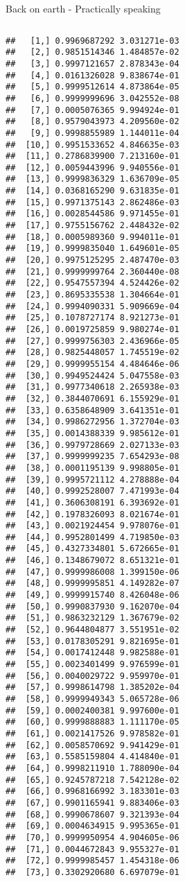 \begin{frame}[fragile]{Back on earth - Practically speaking}
\begin{columns}
\begin{column}{0.5\textwidth}
\begin{knitrout}
\begin{kframe}
\begin{verbatim}
##   [1,] 0.9969687292 3.031271e-03
##   [2,] 0.9851514346 1.484857e-02
##   [3,] 0.9997121657 2.878343e-04
##   [4,] 0.0161326028 9.838674e-01
##   [5,] 0.9999512614 4.873864e-05
##   [6,] 0.9999999696 3.042552e-08
##   [7,] 0.0005076365 9.994924e-01
##   [8,] 0.9579043973 4.209560e-02
##   [9,] 0.9998855989 1.144011e-04
##  [10,] 0.9951533652 4.846635e-03
##  [11,] 0.2786839900 7.213160e-01
##  [12,] 0.0059443996 9.940556e-01
##  [13,] 0.9999836329 1.636709e-05
##  [14,] 0.0368165290 9.631835e-01
##  [15,] 0.9971375143 2.862486e-03
##  [16,] 0.0028544586 9.971455e-01
##  [17,] 0.9755156762 2.448432e-02
##  [18,] 0.0005989360 9.994011e-01
##  [19,] 0.9999835040 1.649601e-05
##  [20,] 0.9975125295 2.487470e-03
##  [21,] 0.9999999764 2.360440e-08
##  [22,] 0.9547557394 4.524426e-02
##  [23,] 0.8695335538 1.304664e-01
##  [24,] 0.9994090331 5.909669e-04
##  [25,] 0.1078727174 8.921273e-01
##  [26,] 0.0019725859 9.980274e-01
##  [27,] 0.9999756303 2.436966e-05
##  [28,] 0.9825448057 1.745519e-02
##  [29,] 0.9999955154 4.484646e-06
##  [30,] 0.9949524424 5.047558e-03
##  [31,] 0.9977340618 2.265938e-03
##  [32,] 0.3844070691 6.155929e-01
##  [33,] 0.6358648909 3.641351e-01
##  [34,] 0.9986272956 1.372704e-03
##  [35,] 0.0014388339 9.985612e-01
##  [36,] 0.9979728669 2.027133e-03
##  [37,] 0.9999999235 7.654293e-08
##  [38,] 0.0001195139 9.998805e-01
##  [39,] 0.9995721112 4.278888e-04
##  [40,] 0.9992528007 7.471993e-04
##  [41,] 0.3606308191 6.393692e-01
##  [42,] 0.1978326093 8.021674e-01
##  [43,] 0.0021924454 9.978076e-01
##  [44,] 0.9952801499 4.719850e-03
##  [45,] 0.4327334801 5.672665e-01
##  [46,] 0.1348679072 8.651321e-01
##  [47,] 0.9999986008 1.399150e-06
##  [48,] 0.9999995851 4.149282e-07
##  [49,] 0.9999915740 8.426048e-06
##  [50,] 0.9990837930 9.162070e-04
##  [51,] 0.9863232129 1.367679e-02
##  [52,] 0.9644804877 3.551951e-02
##  [53,] 0.0178305291 9.821695e-01
##  [54,] 0.0017412448 9.982588e-01
##  [55,] 0.0023401499 9.976599e-01
##  [56,] 0.0040029722 9.959970e-01
##  [57,] 0.9998614798 1.385202e-04
##  [58,] 0.9999949343 5.065728e-06
##  [59,] 0.0002400381 9.997600e-01
##  [60,] 0.9999888883 1.111170e-05
##  [61,] 0.0021417526 9.978582e-01
##  [62,] 0.0058570692 9.941429e-01
##  [63,] 0.5585159804 4.414840e-01
##  [64,] 0.9998211910 1.788090e-04
##  [65,] 0.9245787218 7.542128e-02
##  [66,] 0.9968166992 3.183301e-03
##  [67,] 0.9901165941 9.883406e-03
##  [68,] 0.9990678607 9.321393e-04
##  [69,] 0.0004634915 9.995365e-01
##  [70,] 0.9999950954 4.904605e-06
##  [71,] 0.0044672843 9.955327e-01
##  [72,] 0.9999985457 1.454318e-06
##  [73,] 0.3302920680 6.697079e-01

\end{verbatim}
\end{kframe}
\end{knitrout}
\end{column}
\end{columns}
\end{frame}
